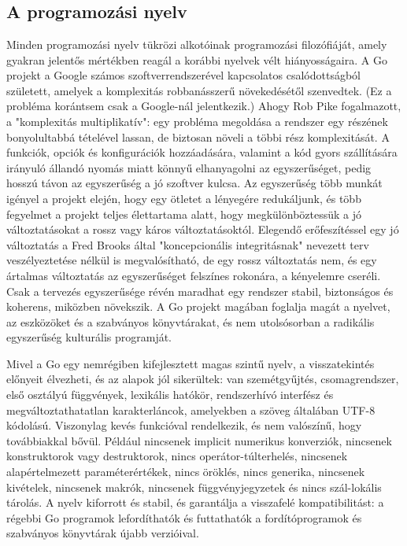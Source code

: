 \chapter{\golang}
\section{A programozási nyelv}
Minden programozási nyelv tükrözi alkotóinak programozási filozófiáját, amely gyakran jelentős mértékben reagál a korábbi nyelvek vélt hiányosságaira. A Go projekt a Google számos szoftverrendszerével kapcsolatos csalódottságból született, amelyek a komplexitás robbanásszerű növekedésétől szenvedtek. (Ez a probléma korántsem csak a Google-nál jelentkezik.) Ahogy Rob Pike fogalmazott, a "komplexitás multiplikatív": egy probléma megoldása a rendszer egy részének bonyolultabbá tételével lassan, de biztosan növeli a többi rész komplexitását. A funkciók, opciók és konfigurációk hozzáadására, valamint a kód gyors szállítására irányuló állandó nyomás miatt könnyű elhanyagolni az egyszerűséget, pedig hosszú távon az egyszerűség a jó szoftver kulcsa. Az egyszerűség több munkát igényel a projekt elején, hogy egy ötletet a lényegére redukáljunk, és több fegyelmet a projekt teljes élettartama alatt, hogy megkülönböztessük a jó változtatásokat a rossz vagy káros változtatásoktól. Elegendő erőfeszítéssel egy jó változtatás a Fred Brooks által "koncepcionális integritásnak" nevezett terv veszélyeztetése nélkül is megvalósítható, de egy rossz változtatás nem, és egy ártalmas változtatás az egyszerűséget felszínes rokonára, a kényelemre cseréli. Csak a tervezés egyszerűsége révén maradhat egy rendszer stabil, biztonságos és koherens, miközben növekszik. A Go projekt magában foglalja magát a nyelvet, az eszközöket és a szabványos könyvtárakat, és nem utolsósorban a radikális egyszerűség kulturális programját.

Mivel a Go egy nemrégiben kifejlesztett magas szintű nyelv, a visszatekintés előnyeit élvezheti, és az alapok jól sikerültek: van szemétgyűjtés, csomagrendszer, első osztályú függvények, lexikális hatókör, rendszerhívó interfész és megváltoztathatatlan karakterláncok, amelyekben a szöveg általában UTF-8 kódolású. Viszonylag kevés funkcióval rendelkezik, és nem valószínű, hogy továbbiakkal bővül. Például nincsenek implicit numerikus konverziók, nincsenek konstruktorok vagy destruktorok, nincs operátor-túlterhelés, nincsenek alapértelmezett paraméterértékek, nincs öröklés, nincs generika, nincsenek kivételek, nincsenek makrók, nincsenek függvényjegyzetek és nincs szál-lokális tárolás. A nyelv kiforrott és stabil, és garantálja a visszafelé kompatibilitást: a régebbi Go programok lefordíthatók és futtathatók a fordítóprogramok és szabványos könyvtárak újabb verzióival.

